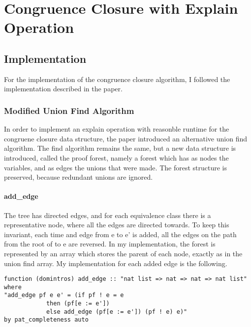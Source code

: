 
\chapter{Congruence Closure with Explain Operation}\label{chapter:congruence_closure}

\section{Implementation}

For the implementation of the congruence closure algorithm, I followed the implementation described in the paper. \cite{Nieuwenhuis}

\subsection{Modified Union Find Algorithm}

In order to implement an explain operation with reasonble runtime for the congruene closure data structure, the paper \cite{Nieuwenhuis} introduced an alternative union find algorithm. The find algorithm remains the same, but a new data structure is introduced, called the proof forest, namely a forest which has as nodes the variables, and as edges the unions that were made. The forest structure is preserved, because redundant unions are ignored. 


\subsubsection{add\_edge}

The tree has directed edges, and for each equivalence class there is a representative node, where all the edges are directed towards. To keep this invariant, each time and edge from e to e' is added, all the edges on the path from the root of to e are reversed. 
In my implementation, the forest is represented by an array which stores the parent of each node, exactly as in the union find array. My implementation for each added edge is the following.

\begin{lstlisting}
function (domintros) add_edge :: "nat list => nat => nat => nat list"
where
"add_edge pf e e' = (if pf ! e = e 
			then (pf[e := e']) 
			else add_edge (pf[e := e']) (pf ! e) e)"
by pat_completeness auto
\end{lstlisting}

